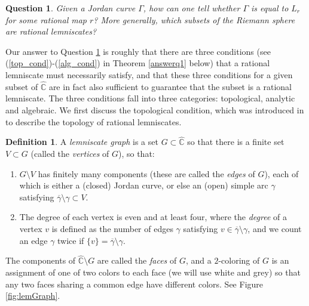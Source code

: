 \documentclass{amsart}
\theoremstyle{plain}
\newtheorem{question}[theorem]{Question}
\theoremstyle{definition}
\newtheorem{definition}[theorem]{Definition}
\theoremstyle{remark}
\newcommand{\hC}{\widehat{\mathbb{C}}}
\begin{document}
\begin{question}
\label{q1}
Given a Jordan curve $\Gamma$, how can one tell whether $\Gamma$ is equal to $L_r$ for some rational map $r$? More generally, which subsets of the Riemann sphere are rational lemniscates?
\end{question}

Our answer to Question \ref{q1} is roughly that there are three conditions (see (\ref{top_cond})-(\ref{alg_cond}) in Theorem \ref{answerq1} below) that a rational lemniscate must necessarily satisfy, and that these three conditions for a given subset of $\hC$ are in fact also sufficient to guarantee that the subset is a rational lemniscate. The three conditions fall into three categories: topological, analytic and algebraic. We first discuss the topological condition, which was introduced in \cite{BishopEremenkoLazebnik2025} to describe the topology of rational lemniscates.

\begin{definition}\label{embeddedgraph}
A  \emph{lemniscate graph} is a set
$G\subset \hC$ so that there is a finite set
$V\subset G$ (called the \emph{vertices} of $G$), so that:
\begin{enumerate}
\item $G\setminus V$ has finitely many components
(these are called the \emph{edges} of $G$),
each of which is either a (closed) Jordan curve,
or else an (open) simple arc $\gamma$ satisfying
$\overline{\gamma}\setminus\gamma\subset V$.
\item The degree of each vertex is even and at least four,
where the \emph{degree} of a vertex $v$ is defined
as the number of edges $\gamma$ satisfying
$v\in\overline{\gamma}\setminus\gamma$, and we count
an edge $\gamma$ twice if $\{v\}=\overline{\gamma}\setminus\gamma$.
\end{enumerate}
The components of $\hC \setminus G$ are called the \emph{faces} of $G$, and a $2$-coloring of $G$ is an assignment of one of two colors to each face (we will use white and grey) so that any two faces sharing a common edge have different colors. See Figure \ref{fig:lemGraph}.
\end{definition}
\end{document}
